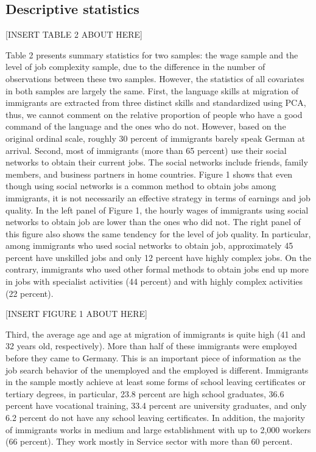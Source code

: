 \documentclass[12pt,a4paper]{article}
\begin{document}
\subsection{Descriptive statistics}

\begin{center}
[INSERT TABLE 2 ABOUT HERE]
\end{center}

Table 2 presents summary statistics for two samples: the wage sample and the level of job complexity sample, due to the difference in the number of observations between these two samples. However, the statistics of all covariates in both samples are largely the same.  First, the language skills at migration of immigrants are extracted from three distinct skills and standardized using PCA, thus, we cannot comment on the relative proportion of people who have a good command of the language and the ones who do not. However, based on the original ordinal scale, roughly 30 percent of immigrants barely speak German at arrival. Second, most of immigrants (more than 65 percent) use their social networks to obtain their current jobs. The social networks include friends, family members, and business partners in home countries. Figure 1 shows that even though using social networks is a common method to obtain jobs among immigrants, it is not necessarily an effective strategy in terms of earnings and job quality. In the left panel of Figure 1, the hourly wages of immigrants using social networks to obtain job are lower than the ones who did not. The right panel of this figure also shows the same tendency for the level of job quality. In particular, among immigrants who used social networks to obtain job, approximately 45 percent have unskilled jobs and only 12 percent have highly complex jobs. On the contrary, immigrants who used other formal methods to obtain jobs end up more in jobs with specialist activities (44 percent) and with highly complex activities (22 percent).

\begin{center}
[INSERT FIGURE 1 ABOUT HERE]
\end{center}

Third, the average age and age at migration of immigrants is quite high (41 and 32 years old, respectively). More than half of these immigrants were employed before they came to Germany. This is an important piece of information as the job search behavior of the unemployed and the employed is different. Immigrants in the sample mostly achieve at least some forms of school leaving certificates or tertiary degrees, in particular, 23.8 percent are high school graduates, 36.6 percent have vocational training, 33.4 percent are university graduates, and only 6.2 percent do not have any school leaving certificates. In addition, the majority of immigrants works in medium and large establishment with up to 2,000 workers (66 percent). They work mostly in Service sector with more than 60 percent. 
\end{document}
